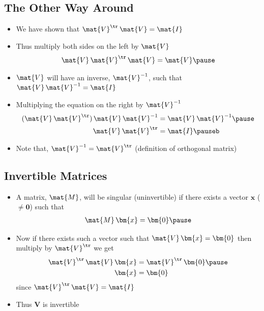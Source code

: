 \begin{slide}
\section[-2]{The Other Way Around}

\begin{PauseHighLight}
  \begin{itemize}
  \item We have shown that $\mat{V}^\tr \, \mat{V} = \mat{I}$\pause
  \item Thus multiply both sides on the left by $\mat{V}$
    \begin{align*}
      \mat{V}\,\mat{V}^\tr \, \mat{V} = \mat{V}\pause
    \end{align*}
  \item $\mat{V}$ will have an inverse,
    $\mat{V}^{-1}$, such that
    $\mat{V} \, \mat{V}^{-1} = \mat{I}$\pause
  \item Multiplying the equation on the right by $\mat{V}^{-1}$
    \begin{align*}
      (\mat{V}\,\mat{V}^\tr) \, \mat{V} \, \mat{V}^{-1}
      &= \mat{V}\,\mat{V}^{-1}\pause  \\
      \mat{V}\,\mat{V}^\tr &= \mat{I}\pauseb
    \end{align*}
  \item Note that, $\mat{V}^{-1}=\mat{V}^\tr$ (definition of
    orthogonal matrix)\pause
  \end{itemize}
\end{PauseHighLight}

\end{slide}


\begin{slide}
\section[-2]{Invertible Matrices}

\begin{PauseHighLight}
  \begin{itemize}
  \item A matrix, $\mat{M}$, will be singular (uninvertible) if there
    exists a vector $\bm{x}$ ($\neq\bm{0}$) such that
    \begin{align*}
      \mat{M}\,\bm{x} = \bm{0}\pause
    \end{align*}
  \item Now if there exists such a vector such that $\mat{V}\,\bm{x} =
    \bm{0}$ then multiply by $\mat{V}^\tr$ we get
    \begin{align*}
      \mat{V}^\tr\, \mat{V}\, \bm{x} &= \mat{V}^\tr\, \bm{0} \pause \\
      \bm{x} &= \bm{0}
    \end{align*}
    since $\mat{V}^\tr\, \mat{V} = \mat{I}$\pauseb
  \item Thus $\bm{V}$ is invertible\pauseb
  \end{itemize}
\end{PauseHighLight}

\end{slide}



